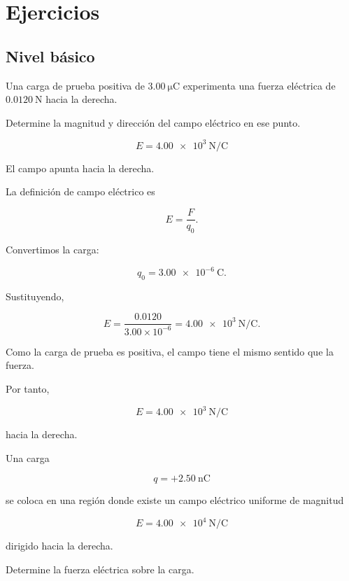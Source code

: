 \section{Ejercicios}

\subsection{Nivel básico}

\begin{ejercicio}

Una carga de prueba positiva de \(\SI{3.00}{\micro\coulomb}\) experimenta una fuerza eléctrica de \(\SI{0.0120}{\newton}\) hacia la derecha.

Determine la magnitud y dirección del campo eléctrico en ese punto.

\end{ejercicio}

\begin{respuesta}

\[
\boxed{E=\SI{4.00e3}{\newton\per\coulomb}}
\]

El campo apunta hacia la derecha.

\end{respuesta}

\begin{explicacion}

La definición de campo eléctrico es

\[
E=\frac{F}{q_0}.
\]

Convertimos la carga:

\[
q_0=\SI{3.00e-6}{\coulomb}.
\]

Sustituyendo,

\[
E=\frac{0.0120}{3.00\times10^{-6}}
=\SI{4.00e3}{\newton\per\coulomb}.
\]

Como la carga de prueba es positiva, el campo tiene el mismo sentido que la fuerza.

Por tanto,

\[
\boxed{E=\SI{4.00e3}{\newton\per\coulomb}}
\]

hacia la derecha.

\end{explicacion}


\begin{ejercicio}

Una carga

\[
q=+\SI{2.50}{\nano\coulomb}
\]

se coloca en una región donde existe un campo eléctrico uniforme de magnitud

\[
E=\SI{4.00e4}{\newton\per\coulomb}
\]

dirigido hacia la derecha.

Determine la fuerza eléctrica sobre la carga.

\end{ejercicio}

